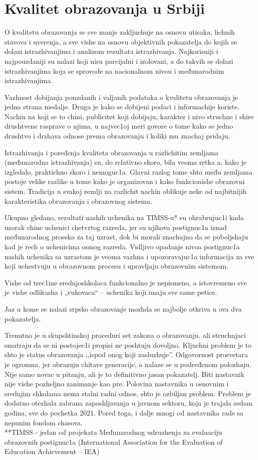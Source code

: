 \documentclass[12pt,twoside]{article}
\begin{document}
\section{Kvalitet obrazovanja u Srbiji}
O kvalitetu obrazovanja se sve manje zakljuchuje na osnovu utisaka, lichnih stavova i uverenja, a sve vishe na osnovu objektivnih pokazatelja do kojih se dolazi istrazhivanjima i analizom rezultata istrazhivanja. Najkorisniji i najpouzdaniji su nalazi koji nisu parcijalni i izolovani, a do takvih se dolazi istrazhivanjima koja se sprovode na nacionalnom nivou i međunarodnim istrazhivanjima.

Vazhnost dobijanja pouzdanih i valjanih podataka o kvalitetu obrazovanja je jedna strana medalje. Druga je kako se dobijeni podaci i informachije koriste. Nachin na koji se to chini, publicitet koji dobijaju, karakter i nivo struchne i shire drushtvene rasprave o njima, u najvec1oj meri govore o tome kako se jedno drushtvo i drzhava odnose prema obrazovanju i koliki mu znachaj pridaju.

Istrazhivanja i poređenja kvaliteta obrazovanja u razlichitim zemljama (međunarodna istrazhivanja) su, do relativno skoro, bila veoma retka a, kako je izgledalo, praktichno skoro i nemoguc1a. Glavni razlog tome shto među zemljama postoje velike razlike u tome kako je organizovan i kako funkcionishe obrazovni sistem. Tradicija u svakoj zemlji na razlichit nachin oblikuje neke od najbitnijih karakteristika obrazovanja i obrazovnog sistema.

Ukupno gledano, rezultati nashih uchenika na TIMSS-u* su ohrabrujuc1i kada uzorak chine uchenici chetvrtog razreda, jer su njihova postignuc1a iznad međunarodnog proseka za taj uzrast, dok bi morali znachajno da se poboljshaju kad je rech o uchenicima osmog razreda. Vidljivo opadanje nivoa postignuc1a nashih uchenika sa uzrastom je veoma vazhna i upozoravajuc1a informacija za sve koji uchestvuju u obrazovnom procesu i upravljaju obrazovnim sistemom.


Vishe od trec1ine srednjoshkolaca funkcionalno je nepismeno, a istovremeno sve je vishe odlikasha i „vukovaca“ – uchenika koji imaju sve same petice.

Jaz u kome se nalazi srpsko obrazovanje mozhda se najbolje otkriva u ova dva pokazatelja.

Trenutno je u skupshtinskoj proceduri set zakona o obrazovanju, ali struchnjaci smatraju da se ni postojec1i propisi ne poshtuju dovoljno.
Kljuchni problem je to shto je status obrazovanja ,,ispod onog koji zasluzhuje''. Odgovornost prosvetara je ogromna, jer obrazuju chitave generacije, a nalaze se u podređenom polozhaju.
Nije samo novac u pitanju, ali je to definitivno jasan pokazatelj. Biti nastavnik nije vishe pozheljno zanimanje kao pre. Polovina nastavnika u osnovnim i srednjim shkolama nema stalni radni odnos, shto je ozbiljan problem.
Problem je dodatno otezhala zabrana zaposhljavanja u javnom sektoru, koja je trajala sedam godina, sve do pochetka 2021.
Pored toga, i dalje mnogi od nastavnika rade sa nepunim fondom chasova. 
\\
**TIMSS - jedan od projekata Međunarodnog udruzhenja za evaluaciju obrazovnih postignuc1a (International Association for the Evaluation of Education Achievement – IEA)
\end{document}
